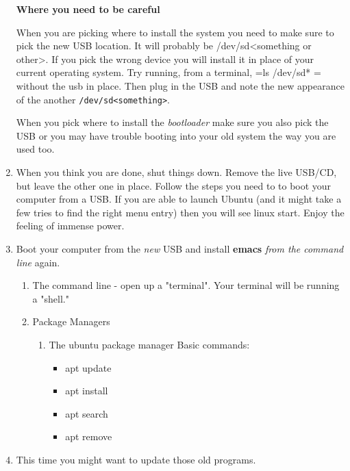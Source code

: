 \documentclass{article}
\begin{document}
\begin{enumerate}
\textbf{\textbf{Where you need to be careful}}

When you are picking where to install the system you need to make sure to pick the new USB location. It will probably be /dev/sd<something or other>. If you pick the wrong device you will install it in place of your current operating system. Try running, from a terminal, =ls /dev/sd* = without the usb in place. Then plug in the USB and note the new appearance of the another \texttt{/dev/sd<something>}. 

When you pick where to install the \emph{bootloader} make sure you also pick the USB or you may have trouble booting into your old system the way you are used too.
\item When you think you are done, shut things down. Remove the live USB/CD, but leave the other one in place. Follow the steps you need to to boot your computer from a USB. If you are able to launch Ubuntu (and it might take a few tries to find the right menu entry) then you will see linux start. Enjoy the feeling of immense power.
\item Boot your computer from the \emph{new} USB and install \textbf{emacs} \emph{from the command line} again.
\begin{enumerate}
\item The command line - open up a "terminal". Your terminal will be running a "shell."
\item Package Managers
\begin{enumerate}
\item The ubuntu package manager
Basic commands: 
\begin{itemize}
\item apt update
\item apt install
\item apt search
\item apt remove
\end{itemize}
\end{enumerate}
\end{enumerate}
\item This time you might want to update those old programs.
\end{enumerate}
\end{document}
